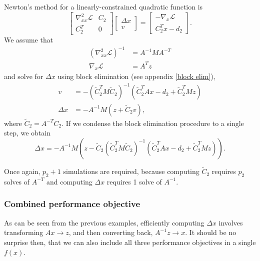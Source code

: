 \documentclass{article}
\newcommand{\tC}{\tilde{C}}
\begin{document}
Newton's method for a linearly-constrained quadratic function is
    \begin{equation}
    \begin{bmatrix} \nabla_{xx}^2 \mathcal{L} & C_2 \\ C_2^T & 0 \end{bmatrix} 
    \begin{bmatrix} \Delta x \\ v \end{bmatrix} = 
    \begin{bmatrix} -\nabla_x\mathcal{L} \\ C_2^T x - d_2 \end{bmatrix}.
    \end{equation}
We assume that 
    \begin{subequations}\begin{align}
    (\nabla_{xx}^2 \mathcal{L})^{-1} &= A^{-1} M A^{-T} \\
    \nabla_x \mathcal{L} &= A^T z
    \end{align}\end{subequations}
    and solve for $\Delta x$ 
    using block elimination (see appendix \ref{block elim}),
    \begin{subequations}\begin{align}
    v &= -(\tC_2^T M \tC_2)^{-1}(\tC_2^T Ax - d_2 + \tC_2^T Mz) \\
    \Delta x &= -A^{-1} M (z + \tC_2 v),
    \end{align}\end{subequations}
    where $\tC_2 = A^{-T} C_2$.
    If we condense the block elimination procedure to a single step,
    we obtain
    \begin{equation}
    \Delta x = -A^{-1} M (z - 
        \tC_2 (\tC_2^T M \tC_2)^{-1}(\tC_2^T Ax - d_2 + \tC_2^T Mz)).
    \end{equation}


Once again, $p_2 + 1$ simulations are required, 
    because computing $\tC_2$ requires $p_2$ solves of $A^{-T}$ and
    computing $\Delta x$ requires 1 solve of $A^{-1}$.

\subsubsection{Combined performance objective}
As can be seen from the previous examples,
    efficiently computing $\Delta x$ involves transforming $Ax \to z$,
    and then converting back, $A^{-1}z \to x$.
It should be no surprise then, 
    that we can also include all three performance objectives 
    in a single $f(x)$.
\end{document}
